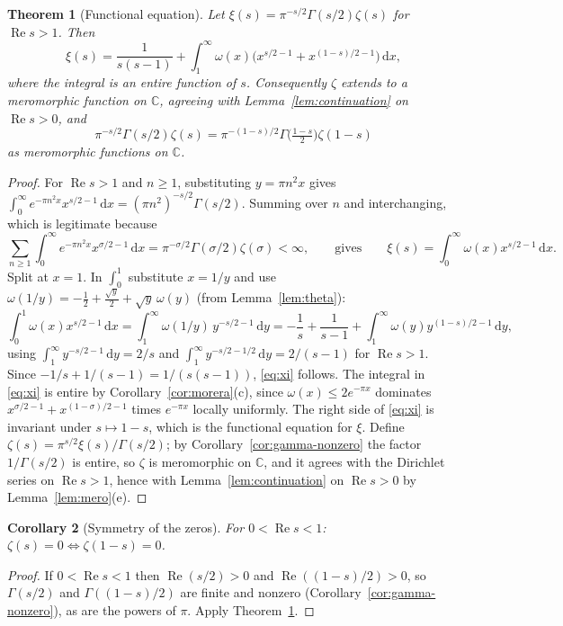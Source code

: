 \documentclass[11pt]{article}
\newtheorem{theorem}{Theorem}[section]
\newtheorem{corollary}[theorem]{Corollary}
\theoremstyle{definition}
\newcommand{\C}{\mathbb{C}}
\newcommand{\re}{\operatorname{Re}}
\newcommand{\dd}{\,\mathrm{d}}
\begin{document}
\begin{theorem}[Functional equation]\label{thm:FE}
Let $\xi(s)=\pi^{-s/2}\Gamma(s/2)\zeta(s)$ for $\re s>1$. Then
\begin{equation}\label{eq:xi}
\xi(s)=\frac{1}{s(s-1)}+\int_1^\infty\omega(x)\bigl(x^{s/2-1}+x^{(1-s)/2-1}\bigr)\dd x ,
\end{equation}
where the integral is an entire function of $s$.
Consequently $\zeta$ extends to a meromorphic function on $\C$, agreeing with Lemma~\ref{lem:continuation} on $\re s>0$, and
\[
\pi^{-s/2}\Gamma(s/2)\zeta(s)=\pi^{-(1-s)/2}\Gamma\bigl(\tfrac{1-s}{2}\bigr)\zeta(1-s)
\]
as meromorphic functions on $\C$.
\end{theorem}
\begin{proof}
For $\re s>1$ and $n\ge1$, substituting $y=\pi n^{2}x$ gives $\int_0^\infty e^{-\pi n^{2}x}x^{s/2-1}\dd x=(\pi n^{2})^{-s/2}\Gamma(s/2)$.
Summing over $n$ and interchanging, which is legitimate because
\[
\sum_{n\ge1}\int_0^\infty e^{-\pi n^2x}x^{\sigma/2-1}\dd x=\pi^{-\sigma/2}\Gamma(\sigma/2)\zeta(\sigma)<\infty ,
\qquad\text{gives}\qquad
\xi(s)=\int_0^\infty\omega(x)x^{s/2-1}\dd x .
\]
Split at $x=1$. In $\int_0^1$ substitute $x=1/y$ and use $\omega(1/y)=-\tfrac12+\tfrac{\sqrt y}{2}+\sqrt y\,\omega(y)$ (from Lemma~\ref{lem:theta}):
\[
\int_0^1\omega(x)x^{s/2-1}\dd x=\int_1^\infty\omega(1/y)\,y^{-s/2-1}\dd y
=-\frac1s+\frac1{s-1}+\int_1^\infty\omega(y)y^{(1-s)/2-1}\dd y ,
\]
using $\int_1^\infty y^{-s/2-1}\dd y=2/s$ and $\int_1^\infty y^{-s/2-1/2}\dd y=2/(s-1)$ for $\re s>1$.
Since $-1/s+1/(s-1)=1/(s(s-1))$, \eqref{eq:xi} follows.
The integral in \eqref{eq:xi} is entire by Corollary~\ref{cor:morera}(c), since $\omega(x)\le2e^{-\pi x}$ dominates $x^{\sigma/2-1}+x^{(1-\sigma)/2-1}$ times $e^{-\pi x}$ locally uniformly.
The right side of \eqref{eq:xi} is invariant under $s\mapsto1-s$, which is the functional equation for $\xi$.
Define $\zeta(s)=\pi^{s/2}\xi(s)/\Gamma(s/2)$; by Corollary~\ref{cor:gamma-nonzero} the factor $1/\Gamma(s/2)$ is entire, so $\zeta$ is meromorphic on $\C$, and it agrees with the Dirichlet series on $\re s>1$, hence with Lemma~\ref{lem:continuation} on $\re s>0$ by Lemma~\ref{lem:mero}(e).
\end{proof}

\begin{corollary}[Symmetry of the zeros]\label{cor:symmetry}
For $0<\re s<1$: $\zeta(s)=0\iff\zeta(1-s)=0$.
\end{corollary}
\begin{proof}
If $0<\re s<1$ then $\re(s/2)>0$ and $\re((1-s)/2)>0$, so $\Gamma(s/2)$ and $\Gamma((1-s)/2)$ are finite and nonzero (Corollary~\ref{cor:gamma-nonzero}), as are the powers of $\pi$.
Apply Theorem~\ref{thm:FE}.
\end{proof}
\end{document}
